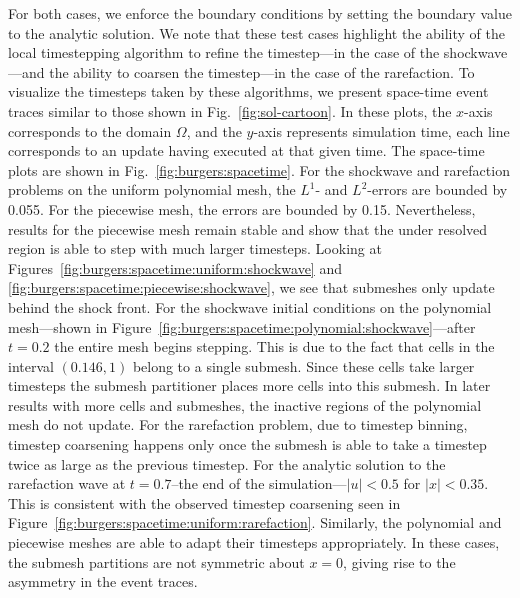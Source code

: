 For both cases, we enforce the boundary conditions by setting the boundary value to the analytic solution. We note that these test cases highlight the ability of the local timestepping algorithm to refine the timestep---in the case of the shockwave---and the ability to coarsen the timestep---in the case of the rarefaction. To visualize the timesteps taken by these algorithms, we present space-time event traces similar to those shown in Fig.~\ref{fig:sol-cartoon}. In these plots, the $x$-axis corresponds to the domain $\Omega$, and the $y$-axis represents simulation time, each line corresponds to an update having executed at that given time. The space-time plots are shown in Fig.~\ref{fig:burgers:spacetime}.  For the shockwave and rarefaction problems on the uniform polynomial mesh, the $L^1$- and $L^2$-errors are bounded by 0.055. For the piecewise mesh, the errors are bounded by 0.15. Nevertheless, results for the piecewise mesh remain stable and show that the under resolved region is able to step with much larger timesteps. Looking at Figures~\ref{fig:burgers:spacetime:uniform:shockwave} and \ref{fig:burgers:spacetime:piecewise:shockwave}, we see that submeshes only update behind the shock front. For the shockwave initial conditions on the polynomial mesh---shown in Figure~\ref{fig:burgers:spacetime:polynomial:shockwave}---after $t=0.2$ the entire mesh begins stepping. This is due to the fact that cells in the interval $(0.146, 1)$ belong to a single submesh. Since these cells take larger timesteps the submesh partitioner places more cells into this submesh. In later results with more cells and submeshes, the inactive regions of the polynomial mesh do not update.
For the rarefaction problem, due to timestep binning, timestep coarsening happens only once the submesh is able to take a timestep twice as large as the previous timestep. 
For the analytic solution to the rarefaction wave at $t=0.7$--the end of the simulation---$|u|<0.5$ for $|x|<0.35$. This is consistent with the observed timestep  coarsening seen in Figure~\ref{fig:burgers:spacetime:uniform:rarefaction}. Similarly, the polynomial and piecewise meshes are able to adapt their timesteps appropriately. In these cases, the submesh partitions are not symmetric about $x=0$, giving rise to the asymmetry in the event traces.


